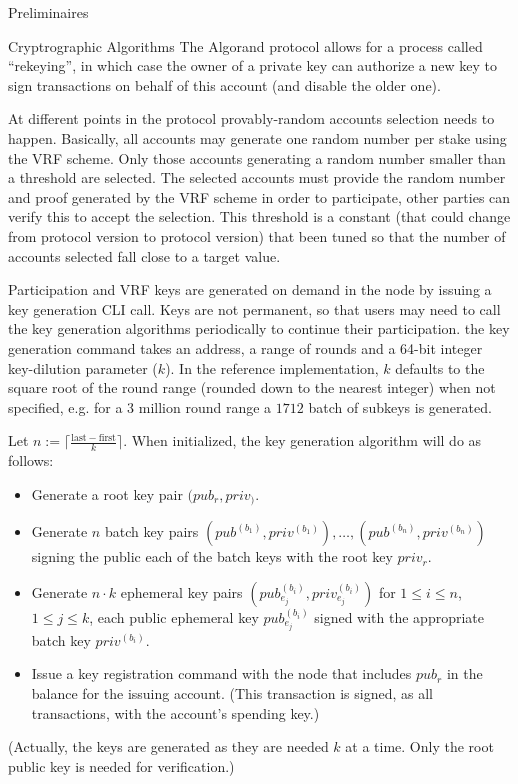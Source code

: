 \documentclass[10pt,a4paper]{article}
\begin{document}
\begin{section}{Preliminaires}
\begin{subsection}{Cryptrographic Algorithms}
    The Algorand protocol allows for a process called ``rekeying'', in which case 
    the owner of a private key can authorize a new key to sign transactions on behalf 
    of this account (and disable the older one).

    At different points in the protocol provably-random accounts selection needs to happen. 
    Basically, all accounts may generate one random number per stake using the VRF scheme.
    Only those accounts generating a random number smaller than a threshold are selected. 
    The selected accounts must provide the random number and proof generated by the VRF 
    scheme in order to participate, other parties can verify this to accept the selection. 
    This threshold is a constant (that could change from protocol version to protocol version) 
    that been tuned so that the number of accounts selected fall close to a target value.

    Participation and VRF keys are generated on demand in the node by issuing a key generation 
    CLI call.
    Keys are not permanent, so that users may need to call the key generation algorithms
    periodically to continue their participation.
    the key generation command takes an address, a range of rounds and a 64-bit 
    integer key-dilution parameter ($k$). In the reference implementation, $k$ 
    defaults to the square root of the round range  (rounded down to the nearest integer) 
    when not specified, e.g. for a 3 million round range a $1712$ batch of subkeys is 
    generated.

    Let $n:=\lceil\frac{\mathrm{last}-\mathrm{first}}{k}\rceil$. 
    When initialized, the key generation algorithm will do as follows:
    \begin{itemize}
        \item Generate a root key pair $(pub_r,priv_)$. 
        \item Generate $n$ batch key pairs $(pub^{(b_1)},priv^{(b_1)}),\ldots, (pub^{(b_n)},priv^{(b_n)})$ signing 
            the public each of the batch keys with the root key $priv_r$.
        \item Generate $n\cdot k$ ephemeral key pairs $(pub^{(b_i)}_{e_j},priv^{(b_i)}_{e_j})$ for $1\le i\le n$, 
            $1\le j\le k$, each public ephemeral key $pub^{(b_i)}_{e_j}$ signed with the appropriate batch 
            key $priv^{(b_i)}$.
        \item Issue a key registration command with the node that includes $pub_r$ in
            the balance for the issuing account. (This transaction is signed, as all transactions,
            with the account's spending key.)
    \end{itemize}
    (Actually, the keys are generated as they are needed $k$ at a time. Only the root public key is
    needed for verification.)


\end{subsection}
\end{section}
\end{document}
